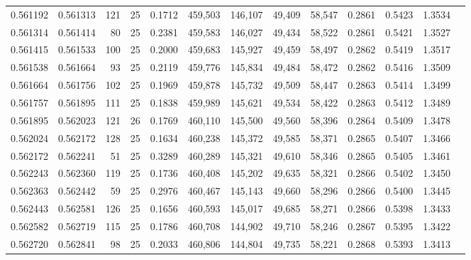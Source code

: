 \begin{tabular}{rrrrrrrrrrrrr}
0.561192 & 0.561313 &   121 &  25 &                                     0.1712 & 459,503 & 146,107 &  49,409 &  58,547 & 0.2861 & 0.5423 & 1.3534 \\
0.561314 & 0.561414 &    80 &  25 &                                     0.2381 & 459,583 & 146,027 &  49,434 &  58,522 & 0.2861 & 0.5421 & 1.3527 \\
0.561415 & 0.561533 &   100 &  25 &                                     0.2000 & 459,683 & 145,927 &  49,459 &  58,497 & 0.2862 & 0.5419 & 1.3517 \\
0.561538 & 0.561664 &    93 &  25 &                                     0.2119 & 459,776 & 145,834 &  49,484 &  58,472 & 0.2862 & 0.5416 & 1.3509 \\
0.561664 & 0.561756 &   102 &  25 &                                     0.1969 & 459,878 & 145,732 &  49,509 &  58,447 & 0.2863 & 0.5414 & 1.3499 \\
0.561757 & 0.561895 &   111 &  25 &                                     0.1838 & 459,989 & 145,621 &  49,534 &  58,422 & 0.2863 & 0.5412 & 1.3489 \\
0.561895 & 0.562023 &   121 &  26 &                                     0.1769 & 460,110 & 145,500 &  49,560 &  58,396 & 0.2864 & 0.5409 & 1.3478 \\
0.562024 & 0.562172 &   128 &  25 &                                     0.1634 & 460,238 & 145,372 &  49,585 &  58,371 & 0.2865 & 0.5407 & 1.3466 \\
0.562172 & 0.562241 &    51 &  25 &                                     0.3289 & 460,289 & 145,321 &  49,610 &  58,346 & 0.2865 & 0.5405 & 1.3461 \\
0.562243 & 0.562360 &   119 &  25 &                                     0.1736 & 460,408 & 145,202 &  49,635 &  58,321 & 0.2866 & 0.5402 & 1.3450 \\
0.562363 & 0.562442 &    59 &  25 &                                     0.2976 & 460,467 & 145,143 &  49,660 &  58,296 & 0.2866 & 0.5400 & 1.3445 \\
0.562443 & 0.562581 &   126 &  25 &                                     0.1656 & 460,593 & 145,017 &  49,685 &  58,271 & 0.2866 & 0.5398 & 1.3433 \\
0.562582 & 0.562719 &   115 &  25 &                                     0.1786 & 460,708 & 144,902 &  49,710 &  58,246 & 0.2867 & 0.5395 & 1.3422 \\
0.562720 & 0.562841 &    98 &  25 &                                     0.2033 & 460,806 & 144,804 &  49,735 &  58,221 & 0.2868 & 0.5393 & 1.3413 \\

\end{tabular}
